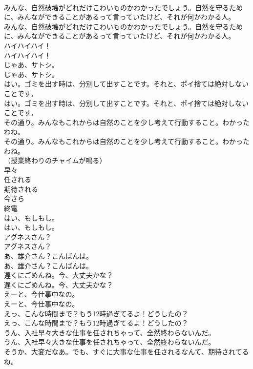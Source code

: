 \documentclass[8pt]{extreport}
\begin{document}
\begin{CJK}{UTF8}{min}
\\	みんな、自然破壊がどれだけこわいものかわかったでしょう。自然を守るために、みんなができることがあるって言っていたけど、それが何かわかる人。	
\\	みんな、自然破壊がどれだけこわいものかわかったでしょう。自然を守るために、みんなができることがあるって言っていたけど、それが何かわかる人。 
\\	ハイハイハイ！	
\\	ハイハイハイ！ 
\\	じゃあ、サトシ。	
\\	じゃあ、サトシ。 
\\	はい。ゴミを出す時は、分別して出すことです。それと、ポイ捨ては絶対しないことです。	
\\	はい。ゴミを出す時は、分別して出すことです。それと、ポイ捨ては絶対しないことです。 
\\	その通り。みんなもこれからは自然のことを少し考えて行動すること。わかったわね。	
\\	その通り。みんなもこれからは自然のことを少し考えて行動すること。わかったわね。 
\\	（授業終わりのチャイムが鳴る）	
\\	早々
\\	任される
\\	期待される
\\	今さら
\\	終電
\\	はい、もしもし。	
\\	はい、もしもし。 
\\	アグネスさん？	
\\	アグネスさん？ 
\\	あ、雄介さん？こんばんは。	
\\	あ、雄介さん？こんばんは。 
\\	遅くにごめんね。今、大丈夫かな？	
\\	遅くにごめんね。今、大丈夫かな？ 
\\	えーと、今仕事中なの。	
\\	えーと、今仕事中なの。 
\\	えっ、こんな時間まで？もう12時過ぎてるよ！どうしたの？	
\\	えっ、こんな時間まで？もう12時過ぎてるよ！どうしたの？ 
\\	うん、入社早々大きな仕事を任されちゃって、全然終わらないんだ。	
\\	うん、入社早々大きな仕事を任されちゃって、全然終わらないんだ。 
\\	そうか、大変だなあ。でも、すぐに大事な仕事を任されるなんて、期待されてるね。	

\end{CJK}
\end{document}
